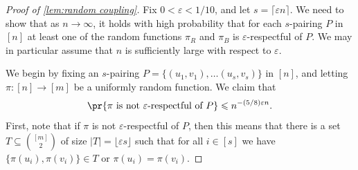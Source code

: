 \documentclass[11pt,reqno,oneside]{amsart}
\theoremstyle{definition}
\newcommand\ab[1]{\lvert#1\rvert}
\newcommand\1{\mathbf{1}}
\newcommand{\eps}{\varepsilon}
\let\leq\leqslant
\begin{document}
\begin{proof}[Proof of \cref{lem:random coupling}]
		Fix $0<\eps<1/10$, and let $s=\lceil \eps n\rceil$. We need to show that as $n \to \infty$, it holds with high probability that for each $s$-pairing $P$ in $[n]$ at least one of the random functions $\pi_R$ and $\pi_B$ is $\varepsilon$-respectful of $P$. We may in particular assume that $n$ is sufficiently large with respect to $\eps$.
        
        We begin by fixing an $s$-pairing $P = \{(u_1,v_1),\dots(u_{s},v_{s})\}$ in $[n]$, and letting $\pi:[n]\to [m]$ be a uniformly random function. We claim that 
	\begin{equation}\label{eq:one pi}
		\pr{\pi \text{ is not }\varepsilon\text{-respectful of }P} \leq n^{-(5/8)\eps n}.
	\end{equation}
	First, note that if $\pi$ is not $\varepsilon$-respectful of $P$, then this means that there is a set $T \subseteq \binom{[m]}2$ of size $\ab T =  \lfloor \varepsilon s\rfloor$ such that for all $i \in [s]$ we have $\{\pi(u_i),\pi(v_i) \} \in T$ or $\pi(u_i)=\pi(v_i)$.


\end{proof}
\end{document}
